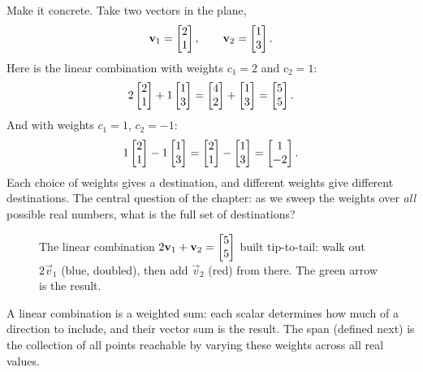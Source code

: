Make it concrete. Take two vectors in the plane,
\[
  \mathbf{v}_1 = \begin{bmatrix}2\\1\end{bmatrix}, \qquad \mathbf{v}_2 = \begin{bmatrix}1\\3\end{bmatrix}.
\]
Here is the linear combination with weights $c_1 = 2$ and $c_2 = 1$:
\[
  2\begin{bmatrix}2\\1\end{bmatrix} + 1\begin{bmatrix}1\\3\end{bmatrix}
  = \begin{bmatrix}4\\2\end{bmatrix} + \begin{bmatrix}1\\3\end{bmatrix}
  = \begin{bmatrix}5\\5\end{bmatrix}.
\]
And with weights $c_1 = 1$, $c_2 = -1$:
\[
  1\begin{bmatrix}2\\1\end{bmatrix} - 1\begin{bmatrix}1\\3\end{bmatrix}
  = \begin{bmatrix}2\\1\end{bmatrix} - \begin{bmatrix}1\\3\end{bmatrix}
  = \begin{bmatrix}1\\-2\end{bmatrix}.
\]
Each choice of weights gives a destination, and different weights give different destinations. The central question of the chapter: as we sweep the weights over \emph{all} possible real numbers, what is the full set of destinations?

\begin{figure}[H]
\centering
{}
\caption{The linear combination $2\mathbf{v}_1 + \mathbf{v}_2 = \begin{bmatrix}5\\5\end{bmatrix}$ built tip-to-tail: walk out $2\vec{v}_1$ (blue, doubled), then add $\vec{v}_2$ (red) from there. The green arrow is the result.}
\label{ch03:one-combo}
\end{figure}

\begin{focusbox}
A linear combination is a weighted sum: each scalar determines how much of a direction to
include, and their vector sum is the result. The span (defined next) is the collection of all
points reachable by varying these weights across all real values.
\end{focusbox}

